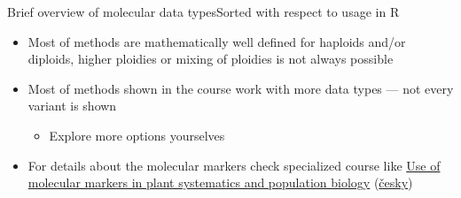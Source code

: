 \documentclass[compress, xelatex, 11pt, xcolor=svgnames, aspectratio=169,
	hyperref={
		bookmarks=true,
		unicode=true,
		colorlinks=true,
		pdftitle={Molecular data in R},
		plainpages=false,
		pdfauthor={Vojtech Zeisek},
		pdfsubject={Course about phylogeny and evolution in R},
		pdfcreator={XeLaTeX},
		pdfkeywords={R, evolution, phylogeny, molecular data},
		linkcolor=Crimson, %
		anchorcolor=Magenta, %
		citecolor=Magenta, %
		filecolor=Magenta, %
		menucolor=Magenta, %
		urlcolor=DodgerBlue, %
		},
	url={hyphens, lowtilde} %
	]{beamer}
\begin{document}
\begin{frame}[allowframebreaks]{Brief overview of molecular data types}{Sorted with respect to usage in R}
\begin{itemize}
\begin{itemize}
\begin{itemize}
				\item Modern methods are quickly developing and able to produce $\sim$10$^{12}$~bp per run and multiplex many individuals
			\end{itemize}
			\item Whole sequences (probes/loci or longer assembled regions) or \href{https://en.wikipedia.org/wiki/Single-nucleotide_polymorphism}{SNPs} (\href{https://en.wikipedia.org/wiki/SNP_genotyping}{Single Nucleotide Polymorphism} --- only polymorphic sites are retained)
		\end{itemize}
		\item Most of methods are mathematically well defined for haploids and/or diploids, higher ploidies or mixing of ploidies is not always possible
		\item Most of methods shown in the course work with more data types --- not every variant is shown
		\begin{itemize}
			\item Explore more options yourselves
		\end{itemize}
		\item For details about the molecular markers check specialized course like \href{https://is.cuni.cz/studium/eng/predmety/index.php?do=predmet&kod=MB120P44}{Use of molecular markers in plant systematics and population biology} (\href{https://is.cuni.cz/studium/predmety/index.php?do=predmet&kod=MB120P44}{česky})
	\end{itemize}
\end{frame}
\end{document}
